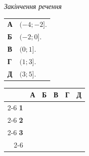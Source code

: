 \documentclass[14pt]{extarticle}
\begin{document}
\noindent
\begin{minipage}[t]{0.55\textwidth}
    \textit{Закінчення речення} \par \vspace{0.2cm}
    \begin{tabular}{ll}
    \textbf{А} & $(-4; -2]$. \\
    \textbf{Б} & $(-2; 0]$. \\
    \textbf{В} & $(0; 1]$. \\
    \textbf{Г} & $(1; 3]$. \\
    \textbf{Д} & $(3; 5]$. \\
    \end{tabular}
\end{minipage}%
\hfill
\begin{minipage}[t]{0.40\textwidth}
    \vspace{0.5cm}
    \begin{flushright}
    \begingroup
    \setlength{\tabcolsep}{4pt}
    \renewcommand{\arraystretch}{1.2}
    \small
    \begin{tabular}{r|c|c|c|c|c|}
         \multicolumn{1}{c}{} & \multicolumn{1}{c}{\textbf{А}} & \multicolumn{1}{c}{\textbf{Б}} & \multicolumn{1}{c}{\textbf{В}} & \multicolumn{1}{c}{\textbf{Г}} & \multicolumn{1}{c}{\textbf{Д}} \\ \cline{2-6}
         \textbf{1} & & & & & \\ \cline{2-6}
         \textbf{2} & & & & & \\ \cline{2-6}
         \textbf{3} & & & & & \\ \cline{2-6}
    \end{tabular}
    \endgroup
    \end{flushright}
\end{minipage}
\end{document}
